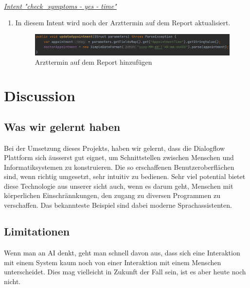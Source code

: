 \documentclass[11pt,a4paper]{article}
\begin{document}
		\underline{\emph{Intent "check\_symptoms - yes - time"}} \\
		\begin{enumerate}
			\item In diesem Intent wird noch der Arzttermin auf dem Report aktualisiert.
			\begin{figure}[h!]
				\begin{center}
            		\includegraphics[width=1.0\linewidth]{JavaClient-UpdateAppointment.png}
					\caption{Arzttermin auf dem Report hinzufügen}
					\label{fig:javaClient_updateAppointment}
				\end{center}
			\end{figure}
		\end{enumerate}
	        
\newpage

\section{Discussion}
    \subsection{Was wir gelernt haben}
        \paragraph{}
            Bei der Umsetzung dieses Projekts, haben wir gelernt, dass die Dialogflow Plattform sich äusserst gut eignet, um Schnittstellen
            zwischen Menschen und Informatiksystemen zu konstruieren. Die so erschaffenen Benutzeroberflächen sind, wenn richtig umgesetzt,
            sehr intuitiv zu bedienen. Sehr viel potential bietet diese Technologie aus unserer sicht auch, wenn es darum geht, Menschen mit
            körperlichen Einschrännkungen, den zugang zu diversen Programmen zu verschaffen. Das bekannteste Beispiel sind dabei moderne Sprachassistenten.
    \subsection{Limitationen}
        \paragraph{}
            Wenn man an AI denkt, geht man schnell davon aus, dass sich eine Interaktion mit einem System kaum noch von einer Interaktion mit einem
            Menschen unterscheidet. Dies mag vielleicht in Zukunft der Fall sein, ist es aber heute noch nicht. 
\end{document}
